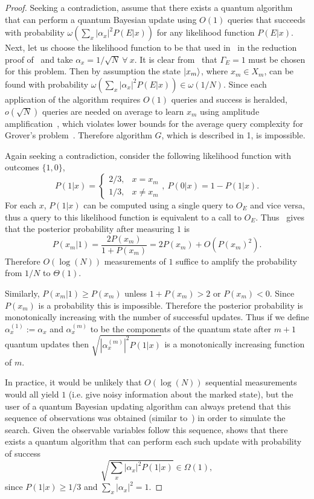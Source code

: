 \documentclass[aps,amsmath,onecolumn,amssymb,notitlepage]{revtex4-1}
\begin{document}
\begin{proof}
Seeking a contradiction, assume that there exists a quantum algorithm that can perform a quantum Bayesian update using $O(1)$ queries that succeeds with probability $\omega({\sum_x |\alpha_x|^2 P(E|x)})$ for any likelihood function $P(E|x)$.  Next, let us choose the likelihood function to be that used in~ in the reduction proof of~ and take $\alpha_x =1/\sqrt{N}~\forall~x$.  It is clear from~ that $\Gamma_E =1$ must be chosen for this problem.  Then by assumption the state $\left|x_m\right\rangle$, where $x_m \in X_m$, can be found with probability $\omega({\sum_x |\alpha_x|^2 P(E|x)})\in \omega(1/{N})$.  Since each application of the algorithm requires $O(1)$ queries and success is heralded, $o(\sqrt{N})$ queries are needed on average to learn $x_m$ using amplitude amplification~\cite{BHM+02}, which violates lower bounds for the average query complexity for Grover's problem~\cite{BGH+96}.  Therefore algorithm $G$, which is described in 1, is impossible.


Again seeking a contradiction, consider the following likelihood function with outcomes $\{1,0\}$,
\begin{equation}
P(1|x) = \begin{cases}
2/3, & x=x_m \\
1/3, & x\ne x_m
\end{cases},~P({0}|x) = 1-P(1|x)\label{eq:bayesgrover}.
\end{equation}
For each $x$, $P(1|x)$ can be computed using a single query to $O_E$ and vice versa, thus a query to this likelihood function is equivalent to a call to $O_E$.
Thus~ gives that the posterior probability after measuring $1$ is
\begin{equation}
P(x_m|1)=\frac{2P(x_m)}{1 + P(x_m)}=2P(x_m) + O(P(x_m)^2).
\end{equation}
Therefore $O(\log(N))$ measurements of $1$ suffice to amplify the probability from $1/N$ to $\Theta(1)$.  

Similarly, $P(x_m|1) \ge P(x_m)$ unless $1+P(x_m) > 2$ or $P(x_m)<0$.  Since $P(x_m)$ is a probability this is impossible.  Therefore the posterior probability is monotonically increasing with the number of successful updates.  Thus if we define $\alpha^{(1)}_x:= \alpha_x$ and $\alpha_x^{(m)}$ to be the components of the quantum state after $m+1$ quantum updates then $\sqrt{|\alpha_x^{(m)}|^2 P(1|x)}$ is a  monotonically increasing function of $m$.

In practice, it would be unlikely that $O(\log(N))$ sequential measurements would all yield $1$ (i.e. give noisy information about the marked state), but the user of a quantum Bayesian updating algorithm can always pretend that this sequence of observations was obtained (similar to~) in order to simulate the search. 
Given the observable variables follow this sequence,  shows that 
there exists a quantum algorithm that can perform each such update with probability of success
\begin{equation}
\sqrt{\sum_x |\alpha_x|^2 P(1|x)} \in \Omega(1),\label{eq:Pfail}
\end{equation}
since $P(1|x) \ge 1/3$ and $\sum_x |\alpha_x|^2 =1$.


\end{proof}
\end{document}
